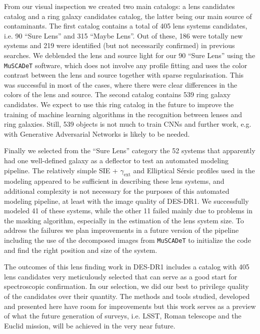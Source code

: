 \documentclass[tradiabstract,twocolumn]{aa}
\begin{document}
From our visual inspection we created two main catalogs: a lens candidates catalog and a ring galaxy candidates catalog, the latter being our main source of contaminants. The first catalog contains a total of 405 lens systems candidates, i.e. 90 “Sure Lens” and 315 “Maybe Lens”. Out of these, 186 were totally new systems and 219 were identified (but not necessarily confirmed) in previous searches. We deblended the lens and source light for our 90 “Sure Lens” using the {\tt  MuSCADeT} software, which does not involve any profile fitting and uses the color contrast between the lens and source together with sparse regularisation. This was successful in most of the cases, where there were clear differences in the colors of the lens and source. The second catalog contains 539 ring galaxy candidates. We expect to use this ring catalog in the future to improve the training of machine learning algorithms in the recognition between lenses and ring galaxies. Still, 539 objects is not much to train CNNs and further work, e.g. with Generative Adversarial Networks is likely to be needed. 

Finally we selected from the “Sure Lens” category the 52 systems that apparently had one well-defined galaxy as a deflector to test an automated modeling pipeline. The relatively simple SIE + $\gamma_{\text{ext}}$ and Elliptical S\'ersic profiles used in the modeling appeared to be sufficient in describing these lens systems, and additional complexity is not necessary for the purposes of this automated modeling pipeline, at least with the image quality of DES-DR1. We successfully modeled 41 of these systems, while the other 11 failed mainly due to problems in the masking algorithm, especially in the estimation of the lens system size. To address the failures we plan improvements in a future version of the pipeline including the use of the decomposed images from {\tt  MuSCADeT} to initialize the code and find the right position and size of the system. 

The outcomes of this lens finding work in DES-DR1 includes a catalog with 405 lens candidates very meticulously selected that can serve as a good start for spectroscopic confirmation. In our selection, we did our best to privilege quality of the candidates over their quantity. The methods and tools studied, developed and presented here have room for improvements but this work serves as a preview of what the future generation of surveys, i.e. LSST, Roman telescope and the Euclid mission, will be achieved in the very near future. 
\end{document}
